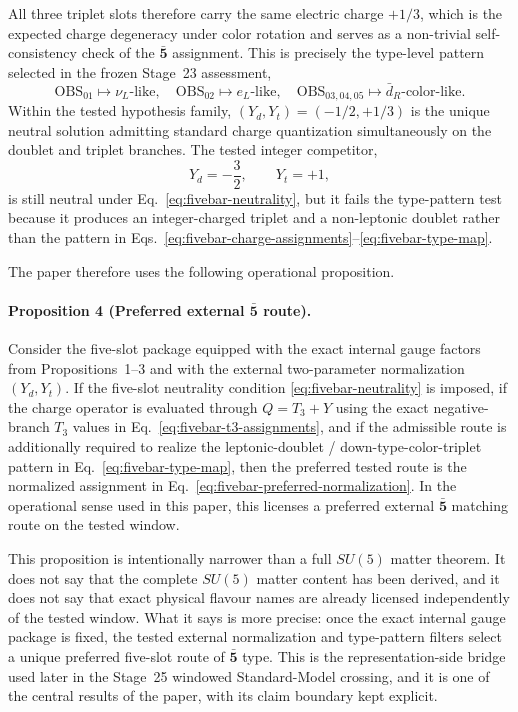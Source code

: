 \documentclass[11pt]{article}
\begin{document}
All three triplet slots therefore carry the same electric charge $+1/3$, which is the expected charge degeneracy under color rotation and serves as a non-trivial self-consistency check of the \texorpdfstring{$\bar{\mathbf 5}$}{5bar} assignment. This is precisely the type-level pattern selected in the frozen Stage~23 assessment,
\begin{equation}
\mathrm{OBS}_{01}\mapsto \nu_L\text{-like},
\quad
\mathrm{OBS}_{02}\mapsto e_L\text{-like},
\quad
\mathrm{OBS}_{03,04,05}\mapsto \bar d_R\text{-color-like}.
\label{eq:fivebar-type-map}
\end{equation}
Within the tested hypothesis family, $(Y_d,Y_t)=(-1/2,+1/3)$ is the unique neutral solution admitting standard charge quantization simultaneously on the doublet and triplet branches. The tested integer competitor,
\begin{equation}
Y_d=-\frac{3}{2},\qquad Y_t=+1,
\label{eq:fivebar-integer-competitor}
\end{equation}
is still neutral under Eq.~\eqref{eq:fivebar-neutrality}, but it fails the type-pattern test because it produces an integer-charged triplet and a non-leptonic doublet rather than the pattern in Eqs.~\eqref{eq:fivebar-charge-assignments}--\eqref{eq:fivebar-type-map}.

The paper therefore uses the following operational proposition.

\paragraph{Proposition 4 (Preferred external \texorpdfstring{$\bar{\mathbf 5}$}{5bar} route).}
Consider the five-slot package equipped with the exact internal gauge factors from Propositions~1--3 and with the external two-parameter normalization $(Y_d,Y_t)$. If the five-slot neutrality condition \eqref{eq:fivebar-neutrality} is imposed, if the charge operator is evaluated through $Q=T_3+Y$ using the exact negative-branch $T_3$ values in Eq.~\eqref{eq:fivebar-t3-assignments}, and if the admissible route is additionally required to realize the leptonic-doublet / down-type-color-triplet pattern in Eq.~\eqref{eq:fivebar-type-map}, then the preferred tested route is the normalized assignment in Eq.~\eqref{eq:fivebar-preferred-normalization}. In the operational sense used in this paper, this licenses a preferred external \texorpdfstring{$\bar{\mathbf 5}$}{5bar} matching route on the tested window.

This proposition is intentionally narrower than a full $SU(5)$ matter theorem. It does not say that the complete $SU(5)$ matter content has been derived, and it does not say that exact physical flavour names are already licensed independently of the tested window. What it says is more precise: once the exact internal gauge package is fixed, the tested external normalization and type-pattern filters select a unique preferred five-slot route of $\bar{\mathbf 5}$ type. This is the representation-side bridge used later in the Stage~25 windowed Standard-Model crossing, and it is one of the central results of the paper, with its claim boundary kept explicit.
\end{document}
